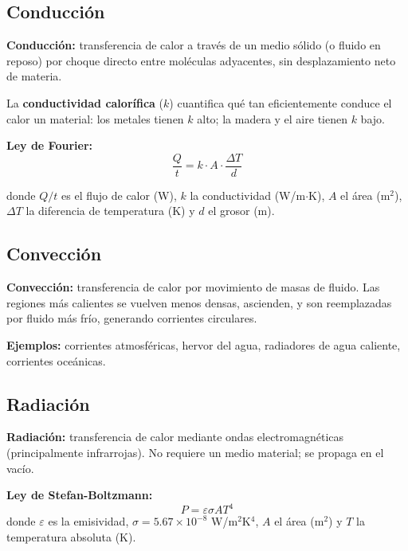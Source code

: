 \subsection{Conducción}

\begin{seccion}
\begin{definicion}
\textbf{Conducción:} transferencia de calor a través de un medio sólido (o fluido en reposo) por choque directo entre moléculas adyacentes, sin desplazamiento neto de materia.
\end{definicion}

La \textbf{conductividad calorífica} ($k$) cuantifica qué tan eficientemente conduce el calor un material: los metales tienen $k$ alto; la madera y el aire tienen $k$ bajo.

\begin{ecuacion}
\textbf{Ley de Fourier:}
$$\frac{Q}{t} = k \cdot A \cdot \frac{\Delta T}{d}$$

donde $Q/t$ es el flujo de calor (W), $k$ la conductividad (W/m$\cdot$K), $A$ el área (m$^2$), $\Delta T$ la diferencia de temperatura (K) y $d$ el grosor (m).
\end{ecuacion}
\end{seccion}

\subsection{Convección}

\begin{seccion}
\begin{definicion}
\textbf{Convección:} transferencia de calor por movimiento de masas de fluido. Las regiones más calientes se vuelven menos densas, ascienden, y son reemplazadas por fluido más frío, generando corrientes circulares.
\end{definicion}

\textbf{Ejemplos:} corrientes atmosféricas, hervor del agua, radiadores de agua caliente, corrientes oceánicas.
\end{seccion}

\subsection{Radiación}

\begin{seccion}
\begin{definicion}
\textbf{Radiación:} transferencia de calor mediante ondas electromagnéticas (principalmente infrarrojas). No requiere un medio material; se propaga en el vacío.
\end{definicion}

\begin{ecuacion}
\textbf{Ley de Stefan-Boltzmann:}
$$P = \varepsilon \sigma A T^4$$
donde $\varepsilon$ es la emisividad, $\sigma = 5.67\times10^{-8}$ W/m$^2$K$^4$, $A$ el área (m$^2$) y $T$ la temperatura absoluta (K).
\end{ecuacion}
\end{seccion}

